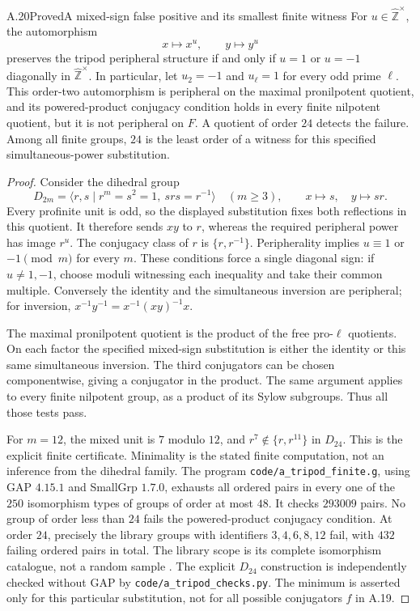 \begin{statement}{A.20}{Proved}{A mixed-sign false positive and its smallest finite witness}
For $u\in\widehat{\mathbb Z}^{\times}$, the automorphism
\[
                  x\longmapsto x^u,\qquad y\longmapsto y^u
\]
preserves the tripod peripheral structure if and only if
$u=1$ or $u=-1$ diagonally in $\widehat{\mathbb Z}^{\times}$.
In particular, let $u_2=-1$ and $u_\ell=1$ for every odd
prime $\ell$. This order-two automorphism is peripheral
on the maximal pronilpotent quotient, and its powered-product
conjugacy condition holds in every finite nilpotent quotient,
but it is not peripheral on $F$.
A quotient of order $24$ detects the failure. Among all
finite groups, $24$ is the least order of a witness for
this specified simultaneous-power substitution.
\end{statement}
\begin{proof}
Consider the dihedral group
\[
 D_{2m}=\langle r,s\mid r^m=s^2=1,\ srs=r^{-1}\rangle
 \quad(m\ge3),
 \qquad x\mapsto s,\quad y\mapsto sr.
\]
Every profinite unit is odd, so the displayed substitution
fixes both reflections in this quotient. It therefore
sends $xy$ to $r$, whereas the required peripheral power
has image $r^u$. The conjugacy class of $r$ is
$\{r,r^{-1}\}$. Peripherality implies
$u\equiv1$ or $-1\pmod m$ for every $m$.
These conditions force a single diagonal sign: if
$u\ne1,-1$, choose moduli witnessing each inequality and
take their common multiple. Conversely the identity and
the simultaneous inversion are peripheral; for inversion,
$x^{-1}y^{-1}=x^{-1}(xy)^{-1}x$.

The maximal pronilpotent quotient is the product of the
free pro-$\ell$ quotients. On each factor the specified
mixed-sign substitution is either the identity or this
same simultaneous inversion. The third conjugators can
be chosen componentwise, giving a conjugator in the
product. The same argument applies to every finite
nilpotent group, as a product of its Sylow subgroups.
Thus all those tests pass.

For $m=12$, the mixed unit is $7$ modulo $12$, and
$r^7\notin\{r,r^{11}\}$ in $D_{24}$. This is the explicit
finite certificate. Minimality is the stated finite
computation, not an inference from the dihedral family.
The program \texttt{code/a\_tripod\_finite.g}, using
GAP $4.15.1$ and SmallGrp $1.7.0$, exhausts all ordered
pairs in every one of the $250$ isomorphism types of groups
of order at most $48$. It checks $293009$ pairs. No group
of order less than $24$ fails the powered-product
conjugacy condition. At order $24$, precisely the library
groups with identifiers $3,4,6,8,12$ fail, with $432$
failing ordered pairs in total. The library scope is its
complete isomorphism catalogue, not a random sample
\citep[\S1.1 and \S1.3]{A_SmallGrpManual}.
The explicit $D_{24}$ construction is independently
checked without GAP by \texttt{code/a\_tripod\_checks.py}.
The minimum is asserted only for this particular
substitution, not for all possible conjugators $f$ in
A.19.
\end{proof}

